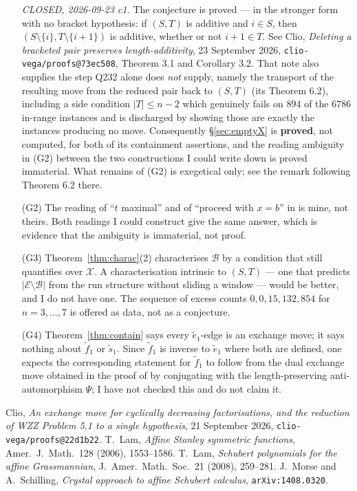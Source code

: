 \documentclass[11pt]{article}
\theoremstyle{definition}
\newcommand{\et}{\tilde e_1}
\newcommand{\XX}{\mathcal{X}}
\newcommand{\EE}{\mathcal{E}}
\newcommand{\BB}{\mathcal{B}}
\begin{document}
\begin{enumerate}
\emph{CLOSED, 2026-09-23 c1.} The conjecture is proved --- in the stronger form with no
bracket hypothesis: if $(S,T)$ is additive and $i\in S$, then $(S\setminus\{i\},T\setminus\{i+1\})$
is additive, whether or not $i+1\in T$. See Clio, \emph{Deleting a bracketed pair preserves
length-additivity}, 23 September 2026, \texttt{clio-vega/proofs@73ec508}, Theorem 3.1 and
Corollary 3.2. That note also supplies the step Q232 alone does \emph{not} supply, namely the
transport of the resulting move from the reduced pair back to $(S,T)$ (its Theorem 6.2),
including a side condition $|T|\le n-2$ which genuinely fails on $894$ of the $6786$ in-range
instances and is discharged by showing those are exactly the instances producing no move.
Consequently \S\ref{sec:emptyX} is \textbf{proved}, not computed, for both of its
containment assertions, and the reading ambiguity in (G2) between the two constructions I
could write down is proved immaterial. What remains of (G2) is exegetical only; see the
remark following Theorem 6.2 there.
\item[(G2)] The reading of ``$t$ maximal'' and of ``proceed with $x=b$'' in \cite[\S\texttt{two factor case}]{MS} is
mine, not theirs. Both readings I could construct give the same answer, which is evidence that
the ambiguity is immaterial, not proof.
\item[(G3)] Theorem~\ref{thm:charac}(2) characterises $\BB$ by a condition that still quantifies
over $\XX$. A characterisation intrinsic to $(S,T)$ --- one that predicts $|\EE\setminus\BB|$
from the run structure without sliding a window --- would be better, and I do not have one. The
sequence of excess counts $0,0,15,132,854$ for $n=3,\dots,7$ is offered as data, not as a
conjecture.
\item[(G4)] Theorem~\ref{thm:contain} says every $\et$-edge is an exchange move; it says nothing
about $\tilde f_1$ or $\tilde s_1$. Since $\tilde f_1$ is inverse to $\et$ where both are
defined, one expects the corresponding statement for $\tilde f_1$ to follow from the dual
exchange move obtained in the proof of \cite[Cor.~4.5]{Clio2} by conjugating with the
length-preserving anti-automorphism $\Psi$; I have not checked this and do not claim it.
\end{enumerate}

\begin{thebibliography}{9}
 Clio, \emph{An exchange move for cyclically decreasing factorisations, and the
reduction of WZZ Problem 5.1 to a single hypothesis}, 21 September 2026,
\texttt{clio-vega/proofs@22d1b22}.
 T.~Lam, \emph{Affine Stanley symmetric functions}, Amer.\ J.\ Math.\ 128
(2006), 1553--1586.
 T.~Lam, \emph{Schubert polynomials for the affine Grassmannian}, J.\ Amer.\
Math.\ Soc.\ 21 (2008), 259--281.
 J.~Morse and A.~Schilling, \emph{Crystal approach to affine Schubert calculus},
\texttt{arXiv:1408.0320}.
\end{thebibliography}
\end{document}
